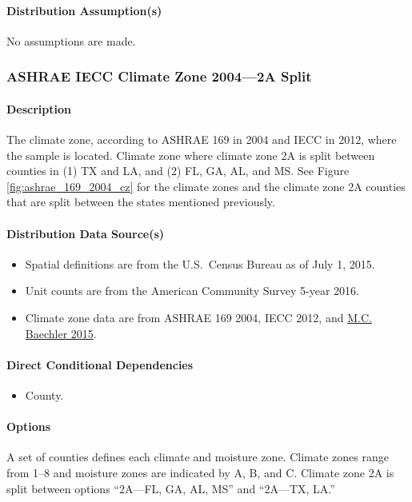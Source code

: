 \paragraph{Distribution Assumption(s)}
No assumptions are made.

\subsubsection{ASHRAE IECC Climate Zone 2004---2A Split}
\paragraph{Description}
The climate zone, according to ASHRAE 169 in 2004 and IECC in 2012, where the sample is located. Climate zone where climate zone 2A is split between counties in (1) TX and LA, and (2) FL, GA, AL, and MS. See Figure \ref{fig:ashrae_169_2004_cz} for the climate zones and the climate zone 2A counties that are split between the states mentioned previously.

\paragraph{Distribution Data Source(s)}
\begin{itemize}
    \item Spatial definitions are from the U.S.~Census Bureau as of July 1, 2015.
    \item Unit counts are from the American Community Survey 5-year 2016.
    \item Climate zone data are from ASHRAE 169 2004, IECC 2012, and \href{https://www.energy.gov/sites/prod/files/2015/10/f27/ba_climate_region_guide_7.3.pdf}{M.C. Baechler 2015}.
\end{itemize}

\paragraph{Direct Conditional Dependencies}
\begin{itemize}
    \item County.
\end{itemize}

\paragraph{Options}
A set of counties defines each climate and moisture zone. Climate zones range from 1--8 and moisture zones are indicated by A, B, and C. Climate zone 2A is split between options ``2A---FL, GA, AL, MS'' and ``2A---TX, LA.''

